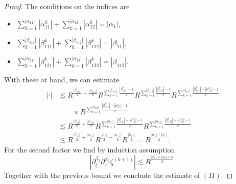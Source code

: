 \documentclass{amsart}
\theoremstyle{definition}
\begin{document}
\begin{proof}
The conditions on the indices are
\begin{itemize}
\item $\sum_{k=1}^{|\alpha_{11}|} |\alpha_{11}^k| + \sum_{k=1}^{|\alpha_{12}|} |\alpha_{12}^k| = |\alpha_1|$,
\item $\sum_{k=1}^{|\beta_{111}|} |\beta_{111}^k| + \sum_{k=1}^{|\beta_{112}|} |\beta_{112}^k| = |\beta_{11}|$,
\item $\sum_{k=1}^{|\alpha_{111}|} |\beta_{121}^k| + \sum_{k=1}^{|\alpha_{12}|} |\beta_{122}^k| = |\beta_{112}|$.
\end{itemize}
With these at hand, we can estimate
\begin{equation*}
\begin{split}
| \cdot | &\lesssim R^{\frac{|\beta_{111}|}{2} + \frac{|\alpha_{111}|}{2}} R^{\sum_{k=1}^{|\beta_{111}|} \frac{|\beta_{111}^k| - 1}{2}} R^{\sum_{k=1}^{|\beta_{112}|} \frac{|\beta_{112}^k|-1}{2}} R^{\sum_{k=1}^{|\alpha_{11}|} \frac{|\beta_{121}^k| + |\alpha_{11}^k| - 1}{2}} \\
&\quad \quad \times R^{\sum_{k=1}^{|\alpha_{12}|} \frac{|\beta_{122}^k| + |\alpha_{12}^k| - 1}{2}} \\
&\lesssim R^{\frac{|\beta_{11}|}{2} + \frac{|\alpha_{11}|}{2}} R^{\sum_{k=1}^{|\alpha_{11}|} \frac{|\beta_{121}^k| + |\alpha_{11}^k| - 1}{2}} R^{\sum_{k=1}^{|\alpha_{12}|} \frac{|\beta_{122}^k| + |\alpha_{12}^k| - 1}{2}} \\
&\lesssim R^{\frac{|\beta_{11}|}{2} + \frac{|\alpha_{11}|}{2}} R^{\frac{|\alpha_1|}{2} - \frac{|\alpha_{11}|}{2}} R^{\frac{|\beta_{12}|}{2}} = R^{\frac{|\alpha_1|+|\beta_1|}{2}}.
\end{split}
\end{equation*}
For the second factor we find by induction assumption
\begin{equation*}
| \partial_{\xi}^{\beta_2} \partial_x^{\alpha_2} \zeta^{(k+1)} | \lesssim R^{\frac{|\beta_2| + |\alpha_2| + k}{2}}.
\end{equation*}
Together with the previous bound we conclude the estimate of $(II)$.


\end{proof}
\end{document}
